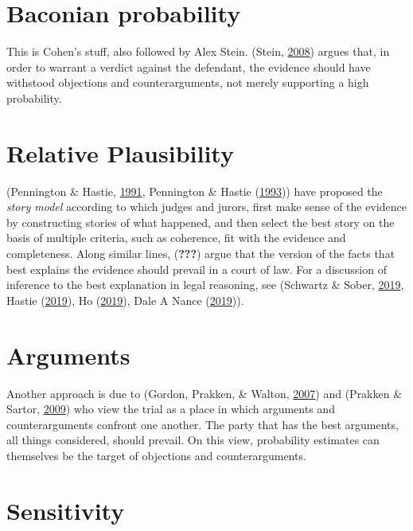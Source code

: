 \documentclass[]{book}
\begin{document}
\section{Baconian probability}

This is Cohen's stuff, also followed by Alex Stein. (Stein,
\protect\hyperlink{ref-stein2008}{2008}) argues that, in order to
warrant a verdict against the defendant, the evidence should have
withstood objections and counterarguments, not merely supporting a high
probability.

\section{Relative Plausibility}

(Pennington \& Hastie, \protect\hyperlink{ref-Pennington1991}{1991},
Pennington \& Hastie (\protect\hyperlink{ref-penn1993}{1993})) have
proposed the \textit{story model} according to which judges and jurors,
first make sense of the evidence by constructing stories of what
happened, and then select the best story on the basis of multiple
criteria, such as coherence, fit with the evidence and completeness.
Along similar lines, ({\textbf{???}}) argue that the version of the
facts that best explains the evidence should prevail in a court of law.
For a discussion of inference to the best explanation in legal
reasoning, see (Schwartz \& Sober,
\protect\hyperlink{ref-schwartz2019WhatRelativePlausibility}{2019},
Hastie
(\protect\hyperlink{ref-hastie2019CaseRelativePlausibilitya}{2019}), Ho
(\protect\hyperlink{ref-lai2019HowPlausibleRelative}{2019}), Dale A
Nance
(\protect\hyperlink{ref-nance2019LimitationsRelativePlausibility}{2019})).

\section{Arguments}

Another approach is due to (Gordon, Prakken, \& Walton,
\protect\hyperlink{ref-gordon2007}{2007}) and (Prakken \& Sartor,
\protect\hyperlink{ref-prakken2009}{2009}) who view the trial as a place
in which arguments and counterarguments confront one another. The party
that has the best arguments, all things considered, should prevail. On
this view, probability estimates can themselves be the target of
objections and counterarguments.

\section{Sensitivity}
\end{document}
